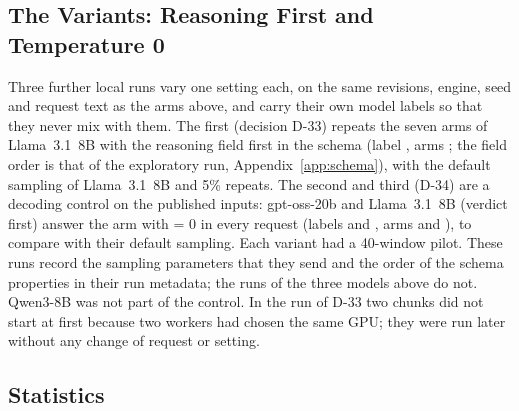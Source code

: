 \subsection{The Variants: Reasoning First and Temperature 0}
\label{sec:methods:variants}

Three further local runs vary one setting each, on the same revisions, engine, seed and request text as the arms above, and carry their own model labels so that they never mix with them. The first (decision D-33) repeats the seven arms of Llama~3.1~8B with the reasoning field first in the schema (label , arms ; the field order is that of the exploratory run, Appendix~\ref{app:schema}), with the default sampling of Llama~3.1~8B and 5\% repeats. The second and third (D-34) are a decoding control on the published inputs: gpt-oss-20b and Llama~3.1~8B (verdict first) answer the arm  with  = 0 in every request (labels  and , arms  and ), to compare with their default sampling. Each variant had a 40-window pilot. These runs record the sampling parameters that they send and the order of the schema properties in their run metadata; the runs of the three models above do not. Qwen3-8B was not part of the control. In the run of D-33 two chunks did not start at first because two workers had chosen the same GPU; they were run later without any change of request or setting.

\subsection{Statistics}
\label{sec:methods:statistics}

